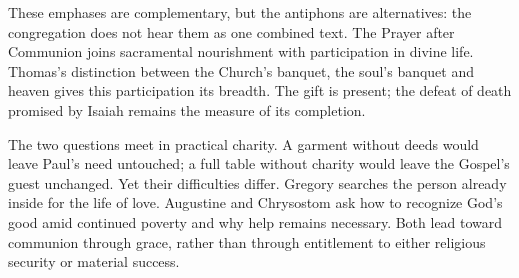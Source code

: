 These emphases are complementary, but the antiphons are alternatives: the congregation does not hear them as one combined text. The Prayer after Communion joins sacramental nourishment with participation in divine life. Thomas's distinction between the Church's banquet, the soul's banquet and heaven gives this participation its breadth. The gift is present; the defeat of death promised by Isaiah remains the measure of its completion.

The two questions meet in practical charity. A garment without deeds would leave Paul's need untouched; a full table without charity would leave the Gospel's guest unchanged. Yet their difficulties differ. Gregory searches the person already inside for the life of love. Augustine and Chrysostom ask how to recognize God's good amid continued poverty and why help remains necessary. Both lead toward communion through grace, rather than through entitlement to either religious security or material success.
\clearpage
